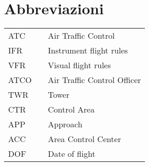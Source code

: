 \cleardoublepage %
\chapter*{Abbreviazioni} %


\begin{tabular}{lll}
    ATC & \hspace{3cm} & Air Traffic Control \\
    IFR & \hspace{3cm} & Instrument flight rules \\
    VFR & \hspace{3cm} & Visual flight rules \\
    ATCO & \hspace{3cm} & Air Traffic Control Officer \\
    TWR & \hspace{3cm} & Tower \\
    CTR & \hspace{3cm} & Control Area \\
    APP & \hspace{3cm} & Approach \\
    ACC & \hspace{3cm} & Area Control Center \\
    DOF & \hspace{3cm} & Date of flight \\
\end{tabular}
